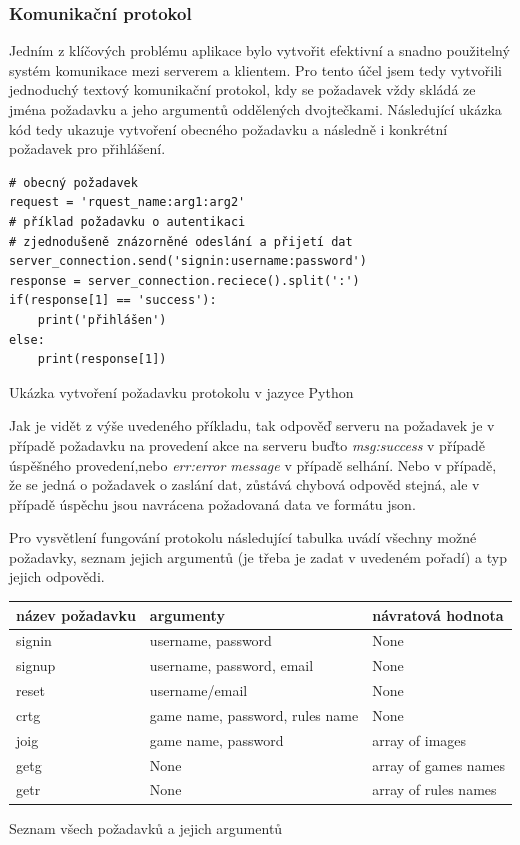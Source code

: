 \documentclass[12pt]{article}
\begin{document}
\subsubsection{Komunikační protokol}
Jedním z klíčových problému aplikace bylo vytvořit efektivní a snadno použitelný systém komunikace mezi serverem a klientem. Pro tento účel jsem tedy vytvořili jednoduchý textový komunikační protokol, kdy se požadavek vždy skládá ze jména požadavku a jeho argumentů oddělených dvojtečkami. Následující ukázka kód tedy ukazuje vytvoření obecného požadavku a následně i konkrétní požadavek pro přihlášení. 
\begin{listing}[!ht]
\begin{verbatim}
# obecný požadavek
request = 'rquest_name:arg1:arg2'
# příklad požadavku o autentikaci
# zjednodušeně znázorněné odeslání a přijetí dat
server_connection.send('signin:username:password') 
response = server_connection.reciece().split(':')
if(response[1] == 'success'):
    print('přihlášen')
else:
    print(response[1])  
\end{verbatim}
\caption{Ukázka vytvoření požadavku protokolu v jazyce Python}
\end{listing}
Jak je vidět z výše uvedeného příkladu, tak odpověď serveru na požadavek je v případě požadavku na provedení akce na serveru buďto \textit{msg:success} v případě úspěšného provedení,nebo \textit{err:error message} v případě selhání. Nebo v případě, že se jedná o požadavek o zaslání dat, zůstává chybová odpověd stejná, ale v případě úspěchu jsou navrácena požadovaná data ve formátu json.

Pro vysvětlení fungování protokolu následující tabulka uvádí všechny možné požadavky, seznam jejich argumentů (je třeba je zadat v uvedeném pořadí) a typ jejich odpovědi.
\newpage
\begin{listing}[!ht]
\begin{tabular}{ |p{4cm}|p{6cm}|p{4cm}| }
\hline
název požadavku & argumenty & návratová hodnota \\
\hline
signin & username, password & None \\
signup & username, password, email & None\\
reset & username/email & None\\
crtg & game name, password, rules name & None\\
joig & game name, password & array of images \\
getg & None & array of games names\\
getr & None & array of rules names\\
\hline
\end{tabular}
\caption{Seznam všech požadavků a jejich argumentů}
\end{listing}
\end{document}
